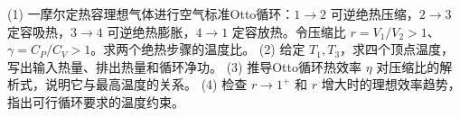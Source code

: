 (1) 一摩尔定热容理想气体进行空气标准Otto循环：\(1\to2\) 可逆绝热压缩，\(2\to3\) 定容吸热，\(3\to4\) 可逆绝热膨胀，\(4\to1\) 定容放热。令压缩比 \(r=V_1/V_2>1\)、\(\gamma=C_P/C_V>1\)。求两个绝热步骤的温度比。
(2) 给定 \(T_1,T_3\)，求四个顶点温度，写出输入热量、排出热量和循环净功。
(3) 推导Otto循环热效率 \(\eta\) 对压缩比的解析式，说明它与最高温度的关系。
(4) 检查 \(r\to1^+\) 和 \(r\) 增大时的理想效率趋势，指出可行循环要求的温度约束。
